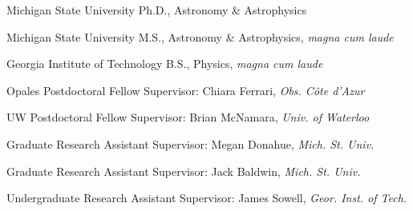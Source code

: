 \documentclass[12pt]{cv}
\begin{document}
\begin{llist}


Michigan State University
Ph.D., Astronomy \& Astrophysics

Michigan State University
M.S., Astronomy \& Astrophysics, \textit{magna cum laude}

Georgia Institute of Technology
B.S., Physics, \textit{magna cum laude}


Opales Postdoctoral Fellow
Supervisor: Chiara Ferrari, {\textit{Obs. C\^ote d'Azur}}

UW Postdoctoral Fellow
Supervisor: Brian McNamara, {\textit{Univ. of Waterloo}}

Graduate Research Assistant
Supervisor: Megan Donahue, {\textit{Mich. St. Univ.}}

Graduate Research Assistant
Supervisor: Jack Baldwin, {\textit{Mich. St. Univ.}}

Undergraduate Research Assistant
Supervisor: James Sowell, {\textit{Geor. Inst. of Tech.}}




\end{llist}
\end{document}
